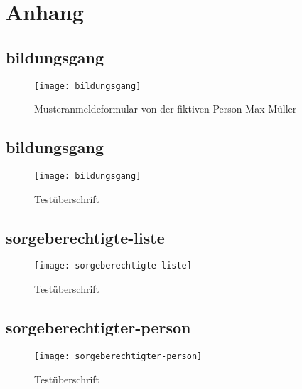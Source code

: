 
\newpage
\section{Anhang}

\subsection{bildungsgang}
\begin{figure}[H]
    \centering
    \caption{Musteranmeldeformular von der fiktiven Person Max Müller}
    \begin{adjustbox}{width=\linewidth, center}
        \texttt{[image: bildungsgang]}
    \end{adjustbox}
\end{figure}

\begin{landscape}

\subsection{bildungsgang}
\begin{figure}[H]
    \centering
    \caption{Testüberschrift}
    \begin{adjustbox}{width=\linewidth, center}
        \texttt{[image: bildungsgang]}
    \end{adjustbox}
\end{figure}

\subsection{sorgeberechtigte-liste}
\begin{figure}[H]
    \centering
    \caption{Testüberschrift}
    \begin{adjustbox}{width=\linewidth, center}
        \texttt{[image: sorgeberechtigte-liste]}
    \end{adjustbox}
\end{figure}

\subsection{sorgeberechtigter-person}
\begin{figure}[H]
    \centering
    \caption{Testüberschrift}
    \begin{adjustbox}{width=0.5\linewidth, center}
        \texttt{[image: sorgeberechtigter-person]}
    \end{adjustbox}
\end{figure}


\end{landscape}

